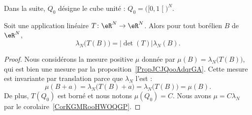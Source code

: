 Dans la suite, \( Q_0\) désigne le cube unité : \( Q_0=\big( \mathopen[ 0 , 1 \mathclose[ \big)^N\).

\begin{theorem}    \label{ThoBVIJooMkifod}
	Soit une application linéaire \( T\colon \eR^N\to \eR^N\). Alors pour tout borélien \( B\) de \( \eR^N\),
	\begin{equation}
		\lambda_N\big( T(B) \big)=| \det(T) |\lambda_N(B).
	\end{equation}
\end{theorem}

\begin{proof}
	Nous considérons la mesure positive \( \mu\) donnée par \( \mu(B)=\lambda_N\big( T(B) \big)\), qui est bien une mesure par la proposition~\ref{PropJCJQooAdqrGA}. Cette mesure est invariante par translation parce que \( \lambda_N\) l'est :
	\begin{equation}
		\mu(B+a)=\lambda_N\big( T(B)+a \big)=\lambda_N\big( T(B) \big)=\mu(B).
	\end{equation}
	De plus, \( T(Q_0)\) est borné et nous notons \( \mu(Q_0)=C\). Nous avons \( \mu=C\lambda_N\) par le corolaire~\ref{CorKGMRooHWOQGP}.


\end{proof}

